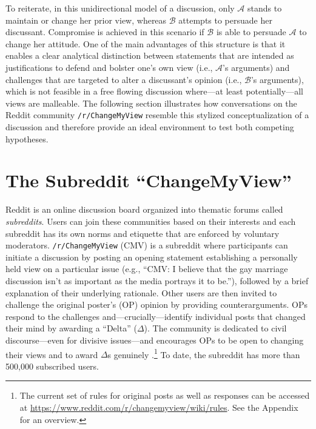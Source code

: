 To reiterate, in this unidirectional model of a discussion, only $\mathcal{A}$ stands to maintain or change her prior view, whereas $\mathcal{B}$ attempts to persuade her discussant. Compromise is achieved in this scenario if $\mathcal{B}$ is able to persuade $\mathcal{A}$ to change her attitude. One of the main advantages of this structure is that it enables a clear analytical distinction between statements that are intended as justifications to defend and bolster one's own view (i.e., $\mathcal{A}$'s arguments) and challenges that are targeted to alter a discussant's opinion (i.e., $\mathcal{B}$'s arguments), which is not feasible in a free flowing discussion where---at least potentially---all views are malleable. The following section illustrates how conversations on the Reddit community \texttt{/r/ChangeMyView} resemble this stylized conceptualization of a discussion and therefore provide an ideal environment to test both competing hypotheses.



\section{The Subreddit ``ChangeMyView''}

Reddit is an online discussion board organized into thematic forums called \textit{subreddits}. Users can join these communities based on their interests and each subreddit has its own norms and etiquette that are enforced by voluntary moderators. \texttt{/r/ChangeMyView} (CMV) is a subreddit where participants can initiate a discussion by posting an opening statement establishing a personally held view on a particular issue (e.g., ``CMV: I believe that the gay marriage discussion isn't as important as the media portrays it to be.''), followed by a brief explanation of their underlying rationale. Other users are then invited to challenge the original poster's (OP) opinion by providing counterarguments. OPs respond to the challenges and---crucially---identify individual posts that changed their mind by awarding a ``Delta'' ($\Delta$). The community is dedicated to civil discourse---even for divisive issues---and encourages OPs to be open to changing their views and to award $\Delta$s genuinely \citep[see also][]{jhaver2017designing}.\footnote{The current set of rules for original posts as well as responses can be accessed at \url{https://www.reddit.com/r/changemyview/wiki/rules}. See the Appendix for an overview.} To date, the subreddit has more than 500,000 subscribed users.

